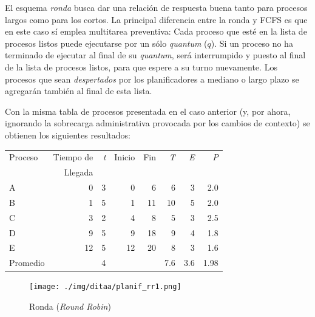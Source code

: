 \documentclass[11pt,fleqn]{book} %
\begin{document}
El esquema \emph{ronda} busca dar una relación de respuesta buena tanto
para procesos largos como para los cortos. La principal diferencia
entre la ronda y FCFS es que en este caso sí emplea multitarea
preventiva: Cada proceso que esté en la lista de procesos listos puede
ejecutarse por un sólo \emph{quantum} ($q$). Si un proceso no ha
terminado de ejecutar al final de su \emph{quantum}, será interrumpido y
puesto al final de la lista de procesos listos, para que espere a su
turno nuevamente. Los procesos que sean \emph{despertados} por los
planificadores a mediano o largo plazo se agregarán también al final
de esta lista.

Con la misma tabla de procesos presentada en el caso anterior
(y, por ahora, ignorando la sobrecarga administrativa provocada por
los cambios de contexto) se obtienen los siguientes resultados:


\begin{center}
\begin{tabular}{lrrrrrrr}
 Proceso   &  Tiempo de  &  \emph{t}  &  Inicio  &  Fin  &  \emph{T}  &  \emph{E}  &  \emph{P}  \\
           &    Llegada  &            &          &       &            &            &            \\
\hline
 A         &          0  &         3  &       0  &    6  &         6  &         3  &       2.0  \\
 B         &          1  &         5  &       1  &   11  &        10  &         5  &       2.0  \\
 C         &          3  &         2  &       4  &    8  &         5  &         3  &       2.5  \\
 D         &          9  &         5  &       9  &   18  &         9  &         4  &       1.8  \\
 E         &         12  &         5  &      12  &   20  &         8  &         3  &       1.6  \\
\hline
 Promedio  &             &         4  &          &       &       7.6  &       3.6  &      1.98  \\
\end{tabular}
\end{center}



\begin{figure}[htb]
\centering
\texttt{[image: ./img/ditaa/planif\_rr1.png]}
\caption{\label{PLAN_planif_rr1}Ronda (\emph{Round Robin})}
\end{figure}
\end{document}

